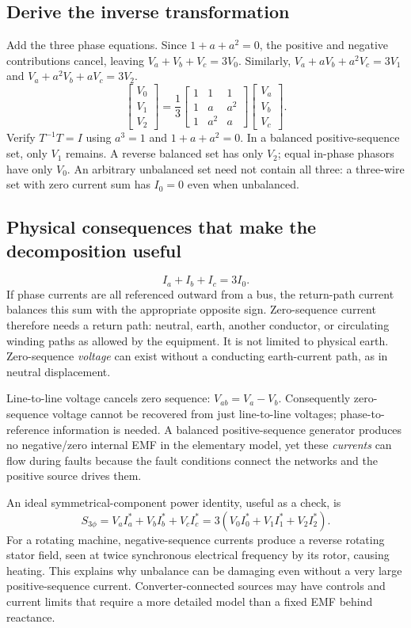 \documentclass[11pt,a4paper]{article}
\newcommand{\ans}[1]{\boxed{#1}}
\begin{document}
\subsection{Derive the inverse transformation}
Add the three phase equations. Since $1+a+a^2=0$, the positive and negative contributions cancel, leaving $V_a+V_b+V_c=3V_0$. Similarly, $V_a+aV_b+a^2V_c=3V_1$ and $V_a+a^2V_b+aV_c=3V_2$.
\[
 \ans{\begin{bmatrix}V_0\\V_1\\V_2\end{bmatrix}=\frac13
 \begin{bmatrix}1&1&1\\1&a&a^2\\1&a^2&a\end{bmatrix}
 \begin{bmatrix}V_a\\V_b\\V_c\end{bmatrix}}.
\]
Verify $T^{-1}T=I$ using $a^3=1$ and $1+a+a^2=0$. In a balanced positive-sequence set, only $V_1$ remains. A reverse balanced set has only $V_2$; equal in-phase phasors have only $V_0$. An arbitrary unbalanced set need not contain all three: a three-wire set with zero current sum has $I_0=0$ even when unbalanced.

\subsection{Physical consequences that make the decomposition useful}
\[
 I_a+I_b+I_c=3I_0.
\]
If phase currents are all referenced outward from a bus, the return-path current balances this sum with the appropriate opposite sign. Zero-sequence current therefore needs a return path: neutral, earth, another conductor, or circulating winding paths as allowed by the equipment. It is not limited to physical earth. Zero-sequence \emph{voltage} can exist without a conducting earth-current path, as in neutral displacement.

Line-to-line voltage cancels zero sequence: $V_{ab}=V_a-V_b$. Consequently zero-sequence voltage cannot be recovered from just line-to-line voltages; phase-to-reference information is needed. A balanced positive-sequence generator produces no negative/zero internal EMF in the elementary model, yet these \emph{currents} can flow during faults because the fault conditions connect the networks and the positive source drives them.

An ideal symmetrical-component power identity, useful as a check, is
\[
 S_{3\phi}=V_aI_a^*+V_bI_b^*+V_cI_c^*
 =3(V_0I_0^*+V_1I_1^*+V_2I_2^*).
\]
For a rotating machine, negative-sequence currents produce a reverse rotating stator field, seen at twice synchronous electrical frequency by its rotor, causing heating. This explains why unbalance can be damaging even without a very large positive-sequence current. Converter-connected sources may have controls and current limits that require a more detailed model than a fixed EMF behind reactance.
\end{document}
